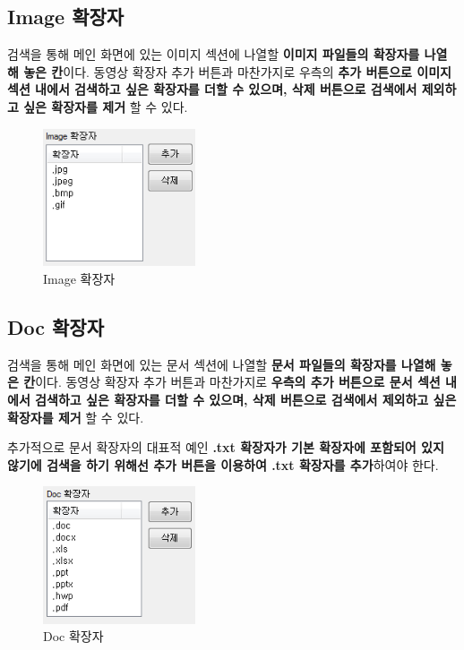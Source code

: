 \documentclass[a4paper, 13pt]{article} %
\begin{document}
		\subsection{Image 확장자}
		검색을 통해 메인 화면에 있는 이미지 섹션에 나열할 \textbf{이미지 파일들의 확장자를 나열해 놓은 칸}이다. 동영상 확장자 추가 버튼과 마찬가지로 우측의 \textbf{추가 버튼으로 이미지 섹션 내에서 검색하고 싶은 확장자를 더할 수 있으며, 삭제 버튼으로 검색에서 제외하고 싶은 확장자를 제거} 할 수 있다.
		
		\begin{figure}[h]
			\centering
			\includegraphics[width=0.4\textwidth]{Figures/Image}
			\caption{Image 확장자}
			\label{fig:image}
		\end{figure}
	
		\newpage
		
		\subsection{Doc 확장자}		
		검색을 통해 메인 화면에 있는 문서 섹션에 나열할 \textbf{문서 파일들의 확장자를 나열해 놓은 칸}이다. 동영상 확장자 추가 버튼과 마찬가지로 \textbf{우측의 추가 버튼으로 문서 섹션 내에서 검색하고 싶은 확장자를 더할 수 있으며, 삭제 버튼으로 검색에서 제외하고 싶은 확장자를 제거} 할 수 있다.
		
		추가적으로 문서 확장자의 대표적 예인 \textbf{.txt 확장자가 기본 확장자에 포함되어 있지 않기에 검색을 하기 위해선 추가 버튼을 이용하여 .txt 확장자를 추가}하여야 한다.
		
		\begin{figure}[h]
			\centering
			\includegraphics[width=0.4\textwidth]{Figures/Doc}
			\caption{Doc 확장자}
			\label{fig:Doc}
		\end{figure}
	
\end{document}
